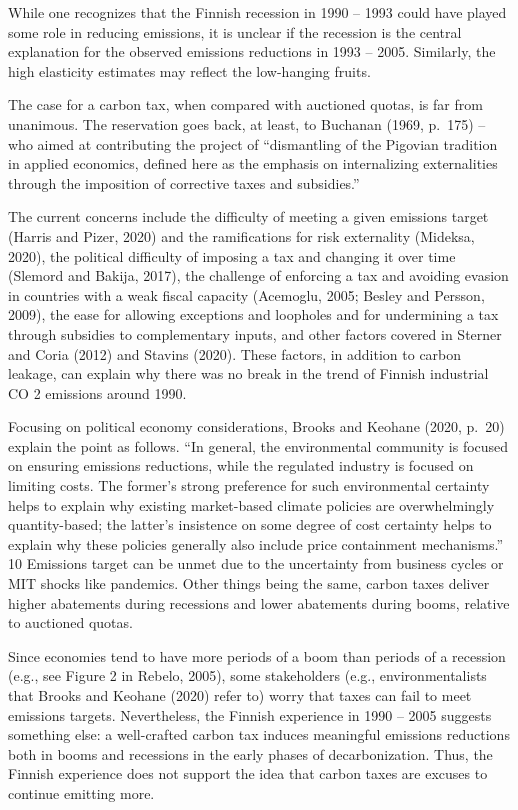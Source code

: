 \documentclass[
]{book}
\begin{document}
While
one recognizes that the Finnish recession in 1990 -- 1993 could have played some role in
reducing emissions, it is unclear if the recession is the central explanation for the observed
emissions reductions in 1993 -- 2005. Similarly, the high elasticity estimates may reflect
the low-hanging fruits.

The case for a carbon tax, when compared with auctioned quotas, is far from
unanimous.
The reservation goes back, at least, to Buchanan (1969, p.~175) -- who
aimed at contributing the project of ``dismantling of the Pigovian tradition in applied
economics, defined here as the emphasis on internalizing externalities through the
imposition of corrective taxes and subsidies.''

The current concerns include the difficulty
of meeting a given emissions target (Harris and Pizer, 2020) and the ramifications for
risk externality (Mideksa, 2020), the political difficulty of imposing a tax and changing
it over time (Slemord and Bakija, 2017), the challenge of enforcing a tax and avoiding
evasion in countries with a weak fiscal capacity (Acemoglu, 2005; Besley and Persson,
2009), the ease for allowing exceptions and loopholes and for undermining a tax through
subsidies to complementary inputs, and other factors covered in Sterner and Coria
(2012) and Stavins (2020). These factors, in addition to carbon leakage, can explain why
there was no break in the trend of Finnish industrial CO 2 emissions around 1990.

Focusing on political economy considerations, Brooks
and Keohane (2020, p.~20) explain the point as follows. ``In general, the environmental
community is focused on ensuring emissions reductions, while the regulated industry is
focused on limiting costs. The former's strong preference for such environmental
certainty helps to explain why existing market-based climate policies are
overwhelmingly quantity-based; the latter's insistence on some degree of cost certainty
helps to explain why these policies generally also include price containment
mechanisms.'' 10 Emissions target can be unmet due to the uncertainty from business
cycles or MIT shocks like pandemics. Other things being the same, carbon taxes deliver
higher abatements during recessions and lower abatements during booms, relative to
auctioned quotas.

Since economies tend to have more periods of a boom than periods of a
recession (e.g., see Figure 2 in Rebelo, 2005), some stakeholders (e.g., environmentalists
that Brooks and Keohane (2020) refer to) worry that taxes can fail to meet emissions
targets. Nevertheless, the Finnish experience in 1990 -- 2005 suggests something else: a
well-crafted carbon tax induces meaningful emissions reductions both in booms and
recessions in the early phases of decarbonization. Thus, the Finnish experience does not
support the idea that carbon taxes are excuses to continue emitting more.
\end{document}
